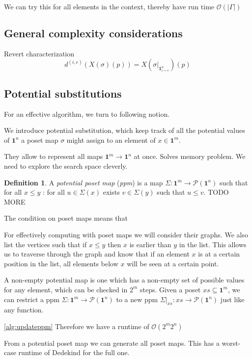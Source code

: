 \documentclass[11pt]{article}
\theoremstyle{definition}
\newtheorem{definition}{Definition}
\newcommand{\mname}[1]{\textit{{#1}}}
\newcommand{\pint}[1]{\mathbf{1}^{#1}}
\newcommand{\pintrestr}[3]{\mathbf{1}^{#1}_{{#2}={#3}}}
\newcommand{\restrict}[2]{{#1}|_{#2}}
\newcommand{\ctxtdim}[1]{|{#1}|}
\newcommand{\dmap}[2]{d^{({#1} , {#2})}}
\newcommand{\pow}[1]{\mathcal{P}({#1})}
\begin{document}
We can try this for all elements in the context, thereby have run time
$\mathcal{O}( \ctxtdim{\Gamma} )$

\subsection{General complexity considerations}


Revert characterization 
$$\dmap{i}{e}(X(\sigma)(p)) = X(\restrict{\sigma}{\pintrestr{n}{i}{e}})(p)$$


\subsection{Potential substitutions}

For an effective algorithm, we turn to following notion.

We introduce potential substitution, which keep track of all the potential
values of $\pint{n}$ a poset map $\sigma$ might assign to an element of $x \in \pint{m}$.

They allow to represent all maps $\pint{m} \to \pint{n}$ at once.
Solves memory problem. We need to explore the search space cleverly.

\begin{definition}
  A \mname{potential poset map} (\mname{ppm}) is a map $\Sigma : \pint{m} \to \pow{\pint{n}}$
  such that for all $x \leq y$ : for all $u \in \Sigma(x)$ exists $v \in
  \Sigma(y)$ such that $u \leq v$. TODO MORE
\end{definition}

The condition on poset maps means that 


For effectively computing with poset maps we will consider their graphs. We also
list the vertices such that if $x \leq y$ then $x$ is earlier than $y$ in the
list. This allows us to traverse through the graph and know that if an element
$x$ is at a certain position in the list, all elements below $x$ will be seen at
a certain point.

A non-empty potential map is one which has a non-empty set of possible values
for any element, which can be checked in $2^m$ steps. Given a poset $xs
\subseteq \pint{m}$, we can restrict a ppm $\Sigma : \pint{m} \to \pow{\pint{n}}$ to a
new ppm $\restrict{\Sigma}{xs} : xs \to \pow{\pint{n}}$ just like any function.

\autoref{alg:updateppm}
Therefore we have a runtime of $\mathcal{O}(2^m 2^n)$

From a potential poset map we can generate all poset maps. This has a worst-case
runtime of Dedekind for the full one.
\end{document}
